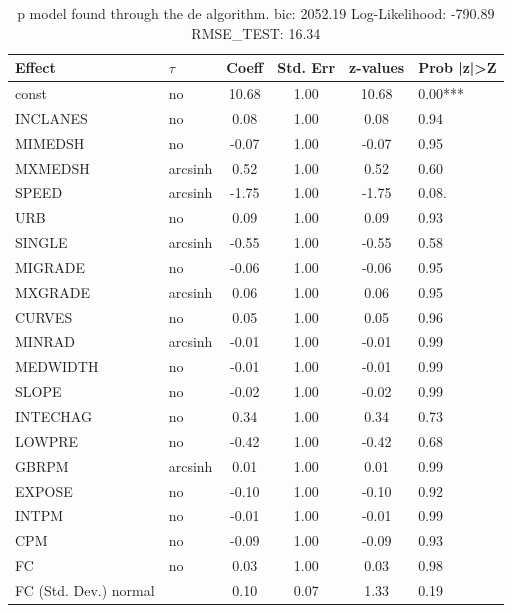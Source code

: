 \begin{table}
	\caption{p model found through the de algorithm. bic: 2052.19 Log-Likelihood: -790.89 RMSE_TEST: 16.34}
	\begin{center}
		\begin{tabular}{|l|l|c|c|c|l|}
			\hline
			Effect & $\tau$ & Coeff & Std. Err & z-values & Prob |z|>Z \\
			\hline
			const & no & 10.68 & 1.00 & 10.68 & 0.00*** \\
			\hline
			INCLANES & no & 0.08 & 1.00 & 0.08 & 0.94 \\
			\hline
			MIMEDSH & no & -0.07 & 1.00 & -0.07 & 0.95 \\
			\hline
			MXMEDSH & arcsinh & 0.52 & 1.00 & 0.52 & 0.60 \\
			\hline
			SPEED & arcsinh & -1.75 & 1.00 & -1.75 & 0.08. \\
			\hline
			URB & no & 0.09 & 1.00 & 0.09 & 0.93 \\
			\hline
			SINGLE & arcsinh & -0.55 & 1.00 & -0.55 & 0.58 \\
			\hline
			MIGRADE & no & -0.06 & 1.00 & -0.06 & 0.95 \\
			\hline
			MXGRADE & arcsinh & 0.06 & 1.00 & 0.06 & 0.95 \\
			\hline
			CURVES & no & 0.05 & 1.00 & 0.05 & 0.96 \\
			\hline
			MINRAD & arcsinh & -0.01 & 1.00 & -0.01 & 0.99 \\
			\hline
			MEDWIDTH & no & -0.01 & 1.00 & -0.01 & 0.99 \\
			\hline
			SLOPE & no & -0.02 & 1.00 & -0.02 & 0.99 \\
			\hline
			INTECHAG & no & 0.34 & 1.00 & 0.34 & 0.73 \\
			\hline
			LOWPRE & no & -0.42 & 1.00 & -0.42 & 0.68 \\
			\hline
			GBRPM & arcsinh & 0.01 & 1.00 & 0.01 & 0.99 \\
			\hline
			EXPOSE & no & -0.10 & 1.00 & -0.10 & 0.92 \\
			\hline
			INTPM & no & -0.01 & 1.00 & -0.01 & 0.99 \\
			\hline
			CPM & no & -0.09 & 1.00 & -0.09 & 0.93 \\
			\hline
			FC & no & 0.03 & 1.00 & 0.03 & 0.98 \\
			\hline
			FC (Std. Dev.) normal &  & 0.10 & 0.07 & 1.33 & 0.19 \\
			\hline
		\end{tabular}
	\end{center}
\end{table}
